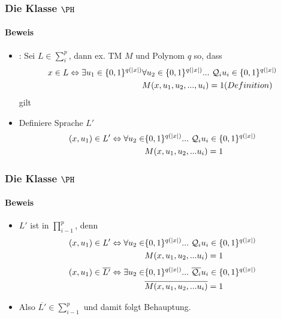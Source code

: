	
\begin{frame}
	\frametitle{Die Klasse $\PH$}
	\framesubtitle{Beweis}
	\begin{itemize}[<+->]
		\item {}: Sei $L \in \sum_{i}^{p}$, dann ex. TM $M$ und Polynom $q$ so, dass \newline
		\begin{align}
			x \in L \Leftrightarrow  \exists u_1 \in \{0,1\}^{q(|x|)} &\forall u_2  \in \{0,1\}^{q(|x|)} ... \ \mathcal{Q}_i u_i \in \{0,1\}^{q(|x|)}  \notag \\
			&M(x,u_1,u_2,...,u_i)=1 \notag
			(Definition)
		\end{align}
		gilt
		\bigskip
		\item Definiere Sprache $L'$
		\begin{align}
		(x,u_1) \in L' \Leftrightarrow \forall u_2 \in &\{0,1\}^{q(|x|)} ... \ \mathcal{Q}_i u_i \in \{0,1\}^{q(|x|)} \notag \\ &M(x,u_1,u_2, ... u_i) = 1 \notag 
		\end{align}
	
	\end{itemize}
\end{frame}
\begin{frame}
	\frametitle{Die Klasse $\PH$}
	\framesubtitle{Beweis}
	\begin{itemize}[<+->]
		\item $L'$ ist in $\prod_{i-1}^{p}$, denn
		\begin{align}
			(x,u_1) \in L' \Leftrightarrow \forall u_2 \in &\{0,1\}^{q(|x|)} ... \ \mathcal{Q}_i u_i \in \{0,1\}^{q(|x|)} \notag \\ &M(x,u_1,u_2, ... u_i) = 1 \notag 
		\end{align}
		\begin{align}
			(x,u_1) \in \overline{L'} \Leftrightarrow \exists u_2 \in &\{0,1\}^{q(|x|)} ... \ \overline{\mathcal{Q}_i} u_i \in \{0,1\}^{q(|x|)} \notag \\ &\overline{M(x,u_1,u_2, ... u_i)} = 1 \notag 
		\end{align}
		\item Also $\overline{L'} \in \sum_{i-1}^{p}$ und damit folgt Behauptung.
	\end{itemize}
\end{frame}
